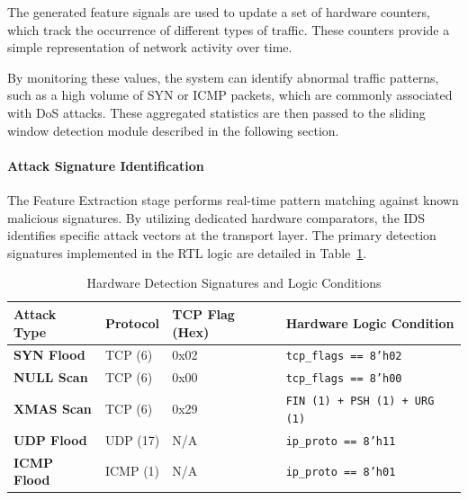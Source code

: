 The generated feature signals are used to update a set of hardware counters,
which track the occurrence of different types of traffic. These counters
provide a simple representation of network activity over time.

By monitoring these values, the system can identify abnormal traffic patterns,
such as a high volume of SYN or ICMP packets, which are commonly associated
with DoS attacks. These aggregated statistics are then passed to the sliding
window detection module described in the following section.

\paragraph{Attack Signature Identification}
The Feature Extraction stage performs real-time pattern matching against known malicious signatures. By utilizing dedicated hardware comparators, the IDS identifies specific attack vectors at the transport layer. The primary detection signatures implemented in the RTL logic are detailed in Table~\ref{tab:signatures}.

\begin{table}[H]
    \centering
    \caption{Hardware Detection Signatures and Logic Conditions}
    \label{tab:signatures}
    \begin{tabular}{l l l l}
        \hline
        \textbf{Attack Type} & \textbf{Protocol} & \textbf{TCP Flag (Hex)} & \textbf{Hardware Logic Condition}    \\ \hline
        \textbf{SYN Flood}   & TCP (6)           & 0x02                    & \texttt{tcp\_flags == 8'h02}         \\
        \textbf{NULL Scan}   & TCP (6)           & 0x00                    & \texttt{tcp\_flags == 8'h00}         \\
        \textbf{XMAS Scan}   & TCP (6)           & 0x29                    & \texttt{FIN (1) + PSH (1) + URG (1)} \\
        \textbf{UDP Flood}   & UDP (17)          & N/A                     & \texttt{ip\_proto == 8'h11}          \\
        \textbf{ICMP Flood}  & ICMP (1)          & N/A                     & \texttt{ip\_proto == 8'h01}          \\ \hline
    \end{tabular}
\end{table}

